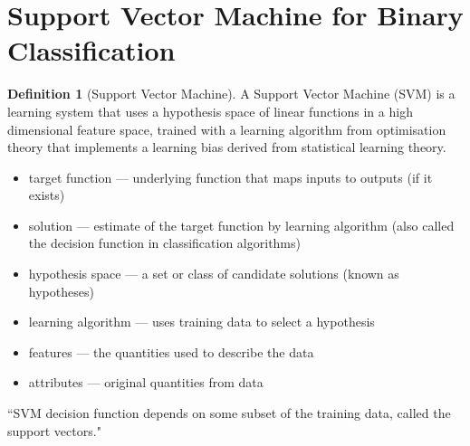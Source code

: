\documentclass[12pt, titlepage]{amsart}
\theoremstyle{definition}
\newtheorem{definition}{Definition}[subsection]
\begin{document}
		
	\section{Support Vector Machine for Binary Classification}\label{svm}
	
	\begin{definition}[Support Vector Machine]
		A Support Vector Machine (SVM) is a learning system that uses a hypothesis space of linear functions in a high dimensional feature space, trained with a learning algorithm from optimisation theory that implements a learning bias derived from statistical learning theory.\cite{christianini}
	\end{definition}
	
	
	\begin{itemize}
		\item target function --- underlying function that maps inputs to outputs (if it exists)
		\item solution --- estimate of the target function by learning algorithm (also called the decision function in classification algorithms)
		\item hypothesis space --- a set or class of candidate solutions (known as hypotheses)
		\item learning algorithm --- uses training data to select a hypothesis 
		\item features --- the quantities used to describe the data
		\item attributes --- original quantities from data
	\end{itemize}
	
	``SVM decision function depends on some subset of the training data, called the support vectors."
		
\end{document}
